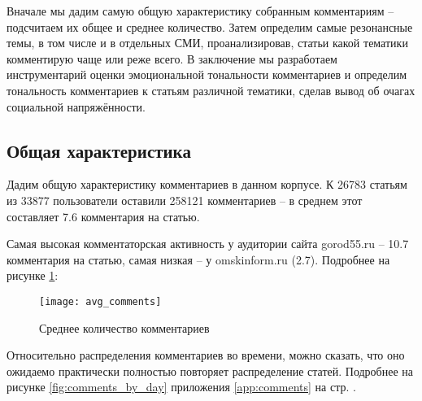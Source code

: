 Вначале мы дадим самую общую характеристику собранным комментариям -- подсчитаем их общее и среднее количество. Затем определим самые резонансные темы, в том числе и в отдельных СМИ, проанализировав, статьи какой тематики комментирую чаще или реже всего. В заключение мы разработаем инструментарий оценки эмоциональной тональности комментариев и определим тональность комментариев к статьям различной тематики, сделав вывод об очагах социальной напряжённости.

\subsection{Общая характеристика}
Дадим общую характеристику комментариев в данном корпусе. К 26783 статьям из 33877 пользователи оставили 258121 комментариев -- в среднем этот составляет 7.6 комментария на статью.

Самая высокая комментаторская активность у аудитории сайта gorod55.ru -- 10.7 комментария на статью, самая низкая -- у omskinform.ru (2.7). Подробнее на рисунке \ref{fig:avg_comments}:
\begin{figure}
	\centering
    \texttt{[image: avg\_comments]}
    \caption{Среднее количество комментариев}
    \label{fig:avg_comments}
\end{figure}

Относительно распределения комментариев во времени, можно сказать, что оно ожидаемо практически полностью повторяет распределение статей. Подробнее на рисунке \ref{fig:comments_by_day} приложения \ref{app:comments} на стр. \pageref{fig:comments_by_day}.

